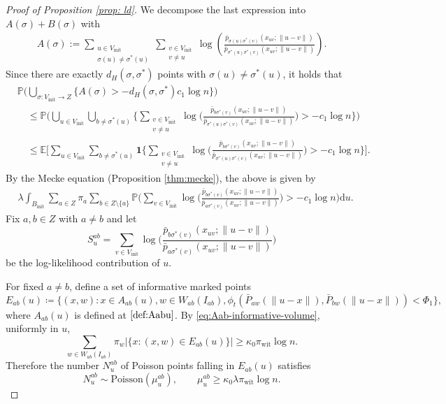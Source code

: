 \documentclass[11pt, a4paper]{amsart}
\renewcommand{\P}{\mathbb{P}}
\newcommand{\E}{\mathbb{E}}
\newcommand{\1}{\mathbf{1}}
\theoremstyle{definition}
\theoremstyle{remark}
\theoremstyle{definition}
\begin{document}
\begin{proof}[Proof of Proposition \ref{prop: ld}]
We decompose the last expression into $A(\sigma) + B(\sigma)$ with
\begin{align*}
A(\sigma) := \sum_{\substack{u \in {V_{\mathrm{init}}} \\ \sigma(u) \neq \sigma^*(u)}} \sum_{\substack{v \in {V_{\mathrm{init}}} \\ v \neq u}} \log \left( \frac{\bar{p}_{\sigma(u) \sigma^*(v)}(x_{uv}; \|u - v\|)}{\bar{p}_{\sigma^*(u) \sigma^*(v)}(x_{uv}; \|u - v\|)} \right).
\end{align*}
Since there are exactly $d_H(\sigma, \sigma^*)$ points with $\sigma(u) \neq \sigma^*(u)$, it holds that
\begin{align*}
&\mathbb{P}\Big( \bigcup_{\sigma: {V_{\mathrm{init}}} \to {Z}} \{ A(\sigma) > -d_H(\sigma, \sigma^*) c_1 \log n \} \Big)\\
&\quad \le \mathbb{P}\Big( \bigcup_{u \in {V_{\mathrm{init}}}} \bigcup_{b \neq \sigma^*(u)} \Big\{ \sum_{\substack{v \in {V_{\mathrm{init}}} \\ v \neq u}} \log \Big( \frac{\bar{p}_{b \sigma^*(v)}(x_{uv}; \|u - v\|)}{\bar{p}_{\sigma^*(u) \sigma^*(v)}(x_{uv}; \|u - v\|)} \Big) > -c_1 \log n \Big\} \Big)\\
&\quad \le \E\Big[\sum_{u \in {V_{\mathrm{init}}}} \sum_{b \neq \sigma^*(u)} \1\Big\{ \sum_{\substack{v \in {V_{\mathrm{init}}} \\ v \neq u}} \log \Big( \frac{\bar{p}_{b \sigma^*(v)}(x_{uv}; \|u - v\|)}{\bar{p}_{\sigma^*(u) \sigma^*(v)}(x_{uv}; \|u - v\|)} \Big) > -c_1 \log n \Big\} \Big].
\end{align*}
By the Mecke equation (Proposition \ref{thm:mecke}), the above is given by
\begin{align}
  &\lambda  \int_{B_{\mathrm{init}}} \sum_{a \in Z} \pi_a \sum_{b \in Z\setminus \{a\}}\P\Big(\sum_{v \in {V_{\mathrm{init}}}} \log \Big( \frac{\bar{p}_{b \sigma^*(v)}(x_{uv}; \|u - v\|)}{\bar{p}_{a \sigma^*(v)}(x_{uv}; \|u - v\|)} \Big) > -c_1 \log n \Big)\mathrm{d}u.\label{eq:Asigma_mecke}
\end{align}
Fix $a,b \in Z$ with $a \neq b$ and let
$$
S_u^{ab} = \sum_{v \in V_{\mathrm{init}}} \log \Big( \frac{\bar{p}_{b \sigma^*(v)}(x_{uv}; \|u - v\|)}{\bar{p}_{a \sigma^*(v)}(x_{uv}; \|u - v\|)} \Big)
 $$ be the log-likelihood contribution of $u$. 
 
For fixed $a \neq b$, define a set of informative marked points
\[
E_{ab}(u)\coloneqq \{(x,w):x \in A_{ab}(u), w\in W_{ab}(I_{ab}),\phi_t(\bar P_{aw}(\|u-x\|),\bar P_{bw}(\|u-x\|))<\Phi_1\},
\]
where $A_{ab}(u)$ is defined at $\eqref{def:Aabu}$.
By \eqref{eq:Aab-informative-volume}, uniformly in $u$,
\[
\sum_{w \in W_{ab}(I_{ab})} \pi_w |\{x:(x,w) \in E_{ab}(u)\}| \ge \kappa_0 \pi_{\mathrm{wit}} \log n.\]
Therefore the number $N_u^{ab}$ of Poisson points falling in $E_{ab}(u)$ satisfies
\[
N_u^{ab} \sim \mathrm{Poisson}(\mu_u^{ab}),\qquad \mu_u^{ab} \ge \kappa_0 \lambda \pi_{\mathrm{wit}} \log n.
\]


\end{proof}
\end{document}
